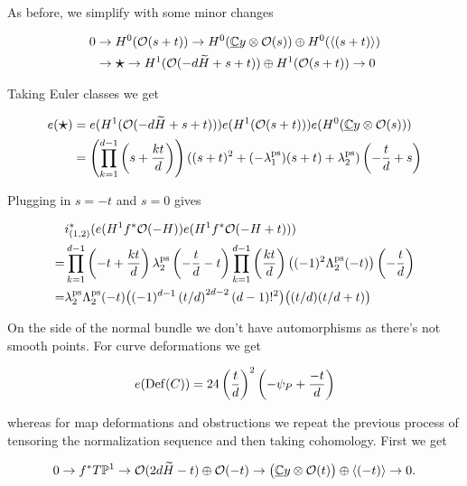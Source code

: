 \documentclass[12pt]{memoir}
\begin{document}
As before, we simplify with some minor changes

\begin{align*}
    0 & \to H^0(\cO(s+t))\to  H^0(\un{\bC}y\ox\cO(s))\oplus H^0(\genr{(s+t)})                                                 \\
      & \to {\raisebox{-0.08em}{\scalebox{1.5}{\ensuremath\star}}}\to H^1(\cO(-d\widetilde{H}+s+t))\oplus H^1(\cO(s+t)) \to 0
\end{align*}

Taking Euler classes we get

\begin{align*}
    e({\raisebox{-0.08em}{\scalebox{1.5}{\ensuremath\star}}}) & =e(H^1(\cO(-d\widetilde{H}+s+t)))e(H^1(\cO(s+t)))e(H^0(\un{\bC}y\ox\cO(s)))                                                    \\
                                                              & =\left(\prod_{k=1}^{d-1}\left(s+\frac{kt}{d}\right)\right)((s+t)^2+(-\la_1^{\ps})(s+t)+\la_2^{\ps})\left(-\frac{t}{d}+s\right) \\
\end{align*}

Plugging in \(s=-t\) and \(s=0\) gives

\begin{align*}
      & i_{(1,2)}^\ast(e(H^1f^\ast\mathcal{O}(-H))e(H^1f^\ast\mathcal{O}(-H+t)))                                                                                                                                \\
    = & \prod_{k=1}^{d-1}\left(-t+\frac{kt}{d}\right)\lambda_2^{\operatorname{\mathrm{ps}}}\left(-\frac{t}{d}-t\right)\prod_{k=1}^{d-1}\left(\frac{kt}{d}\right)\bigl((-1)^2\Lambda_2^{\operatorname{\mathrm{ps}}}(-t)\bigr)\left(-\frac{t}{d}\right) \\
    = & \lambda_2^{\operatorname{\mathrm{ps}}}\Lambda_2^{\operatorname{\mathrm{ps}}}(-t)\bigl((-1)^{d-1}\left({t}/{d}\right)^{2d-2}(d-1)!^2\bigr)\bigl((t/d)(t/d+t)\bigr)
\end{align*}

On the side of the normal bundle we don't have automorphisms as there's not smooth points. For curve deformations we get


\[e(\operatorname{Def}(C))=24\left(\frac{t}{d}\right)^2\left(-\psi_P+\frac{-t}{d}\right)\]


whereas for map deformations and obstructions we repeat the previous process of tensoring the normalization sequence and then taking cohomology. First we get


\[0\to f^\ast T\mathbb{P}^1\to \mathcal{O}(2d\widetilde{H}-t)\oplus\mathcal{O}(-t)\to\bigl(\underline{\mathbb{C}}y\otimes\mathcal{O}(t)\bigr)\oplus\left\langle (-t)\right\rangle\to 0.\]
\end{document}
